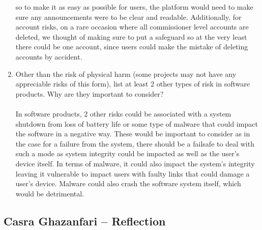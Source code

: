 \documentclass{article}
\begin{document}
\begin{enumerate}
  so to make it as easy as possible for users, the platform would need to make sure any
  announcements were to be clear and readable. Additionally, for account risks,
  on a rare occasion where all commissioner level accounts are deleted, we thought of
  making sure to put a safeguard so at the very least there could be one account, since
  users could make the mistake of deleting accounts by accident.
  \item Other than the risk of physical harm (some projects may not have any
  appreciable risks of this form), list at least 2 other types of risk in
  software products. Why are they important to consider?\\\\
  In software products, 2 other risks could be associated with a system shutdown from
  loss of battery life or some type of malware that could impact the software in
  a negative way. These would be important to consider as in the case for a failure
  from the system, there should be a failsafe to deal with such a mode as system integrity
  could be impacted as well as the user's device itself. In terms of malware, it could
  also impact the system's integrity leaving it vulnerable to impact users with faulty
  links that could damage a user's device. Malware could also crash the software system
  itself, which would be detrimental.

\end{enumerate}

\subsection*{Casra Ghazanfari -- Reflection}
\end{document}
